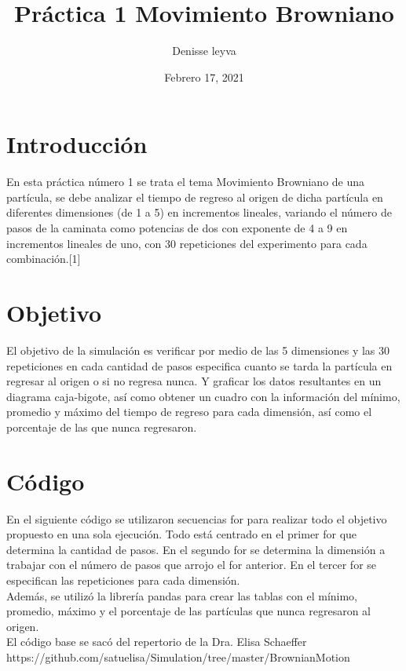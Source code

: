 \documentclass{article}
\title{Práctica 1 Movimiento Browniano}
\author{Denisse leyva}
\date{Febrero 17, 2021}
\begin{document}
\maketitle

\section{Introducción}
En esta práctica número 1 se trata el tema Movimiento Browniano de una partícula, se debe analizar el tiempo de regreso al origen de dicha partícula en diferentes dimensiones (de 1 a 5) en incrementos lineales, variando el número de pasos de la caminata como potencias de dos con exponente de 4 a 9 en incrementos lineales de uno, con 30 repeticiones del experimento para cada combinación.[1]  


\section{Objetivo}
El objetivo de la simulación es verificar por medio de las 5 dimensiones y las 30 repeticiones en cada cantidad de pasos especifica cuanto se tarda la partícula en regresar al origen o si no regresa nunca. 
Y graficar los datos resultantes en un diagrama caja-bigote, así como obtener un cuadro con la información del mínimo, promedio y máximo del tiempo de regreso para cada dimensión, así como el porcentaje de las que nunca regresaron.



\section{Código}
En el siguiente código se utilizaron secuencias for para realizar todo el objetivo propuesto en una sola ejecución.
Todo está centrado en el primer for que determina la cantidad de pasos. En el segundo for se determina la dimensión a trabajar con el número de pasos que arrojo el for anterior. En el tercer for se especifican las repeticiones para cada dimensión.\\
Además, se utilizó la librería pandas para crear las tablas con el mínimo, promedio, máximo y el porcentaje de las partículas que nunca regresaron al origen.\\
El código base se sacó del repertorio de la Dra. Elisa Schaeffer\\ https://github.com/satuelisa/Simulation/tree/master/BrownianMotion
\\
\end{document}
